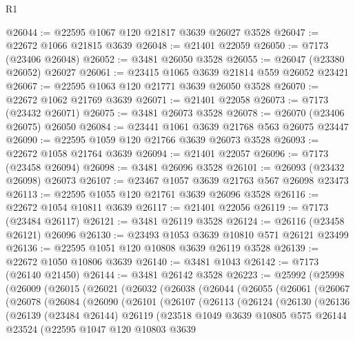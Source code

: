 \begin{lexlean}{R1}
\begin{coremodule}
@26044 := @22595 @1067 @120 @21817 @3639 @26027 @3528
@26047 := @22672 @1066 @21815 @3639
@26048 := @21401 @22059
@26050 := @7173 (@23406 @26048)
@26052 := @3481 @26050 @3528
@26055 := @26047 (@23380 @26052) @26027
@26061 := @23415 @1065 @3639 @21814 @559 @26052 @23421
@26067 := @22595 @1063 @120 @21771 @3639 @26050 @3528
@26070 := @22672 @1062 @21769 @3639
@26071 := @21401 @22058
@26073 := @7173 (@23432 @26071)
@26075 := @3481 @26073 @3528
@26078 := @26070 (@23406 @26075) @26050
@26084 := @23441 @1061 @3639 @21768 @563 @26075 @23447
@26090 := @22595 @1059 @120 @21766 @3639 @26073 @3528
@26093 := @22672 @1058 @21764 @3639
@26094 := @21401 @22057
@26096 := @7173 (@23458 @26094)
@26098 := @3481 @26096 @3528
@26101 := @26093 (@23432 @26098) @26073
@26107 := @23467 @1057 @3639 @21763 @567 @26098 @23473
@26113 := @22595 @1055 @120 @21761 @3639 @26096 @3528
@26116 := @22672 @1054 @10811 @3639
@26117 := @21401 @22056
@26119 := @7173 (@23484 @26117)
@26121 := @3481 @26119 @3528
@26124 := @26116 (@23458 @26121) @26096
@26130 := @23493 @1053 @3639 @10810 @571 @26121 @23499
@26136 := @22595 @1051 @120 @10808 @3639 @26119 @3528
@26139 := @22672 @1050 @10806 @3639
@26140 := @3481 @1043
@26142 := @7173 (@26140 @21450)
@26144 := @3481 @26142 @3528
@26223 := @25992
    (@25998
      (@26009
        (@26015
          (@26021
            (@26032
              (@26038
                (@26044
                  (@26055
                    (@26061
                      (@26067
                        (@26078
                          (@26084
                            (@26090
                              (@26101
                                (@26107
                                  (@26113
                                    (@26124
                                      (@26130
                                        (@26136
                                          (@26139
                                            (@23484 @26144)
                                            @26119
                                            (@23518
                                              @1049
                                              @3639
                                              @10805
                                              @575
                                              @26144
                                              @23524
                                              (@22595
                                                @1047
                                                @120
                                                @10803
                                                @3639

\end{coremodule}
\end{lexlean}
